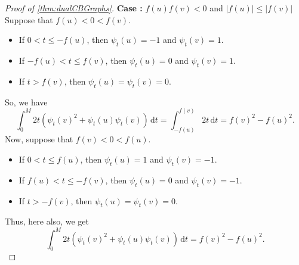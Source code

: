\documentclass[12pt,a4paper,bold]{thesis}
\theoremstyle{definition}
\newcommand*{\abs}[1]{\left\vert #1 \right\vert}
\newcounter{casenum}
\newenvironment{caseof}{\setcounter{casenum}{1}}{\vskip0\baselineskip}
\newcommand{\case}[2]{\vskip0\baselineskip\par\noindent 
{\bfseries Case \arabic{casenum}:} #1\\#2\addtocounter{casenum}{1}}
\begin{document}
\begin{proof}[Proof of \cref{thm:dualCBGraphs}]
\begin{caseof}
        \case{$f(u)f(v) < 0$ and $\abs{f(u)} \leq \abs{f(v)}$}
        {Suppose that $f(u) < 0 < f(v)$. 
        \vspace{-0.4\baselineskip} 
        \begin{itemize}[leftmargin=*,noitemsep]
            \item If $0 < t \leq -f(u)$, then $\psi_t(u) = -1$ and $\psi_t(v) = 1$.
            \item If $-f(u) < t \leq f(v)$, then $\psi_t(u) = 0$ and $\psi_t(v) = 1$.
            \item If $t > f(v)$, then $\psi_t(u) = \psi_t(v) = 0$.
        \end{itemize}
        \vspace{-0.4\baselineskip}
        So, we have 
        \begin{equation*}
            \int_{0}^{M} 2t (\psi_t(v)^2 + \psi_t(u)\psi_t(v))\, \mathrm{d}t 
            = \int_{-f(u)}^{f(v)} 2t\, \mathrm{d}t
            = f(v)^2 - f(u)^2.
        \end{equation*}
        Now, suppose that $f(v) < 0 < f(u)$.
        \vspace{-0.4\baselineskip} 
        \begin{itemize}[leftmargin=*,noitemsep]
            \item If $0 < t \leq f(u)$, then $\psi_t(u) = 1$ and $\psi_t(v) = -1$.
            \item If $f(u) < t \leq -f(v)$, then $\psi_t(u) = 0$ and $\psi_t(v) = -1$.
            \item If $t > -f(v)$, then $\psi_t(u) = \psi_t(v) = 0$.
        \end{itemize}
        \vspace{-0.4\baselineskip}
        Thus, here also, we get
        \begin{equation*}
            \int_{0}^{M} 2t (\psi_t(v)^2 + \psi_t(u)\psi_t(v))\, \mathrm{d}t = f(v)^2 - f(u)^2.
        \end{equation*}}


\end{caseof}
\end{proof}
\end{document}
